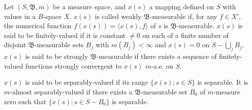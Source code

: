 \label{sec:V.4}

\begin{definition}\label{def:V.4.Definition.1} Let $(S, \mathfrak{B}, m)$ be a measure space, and $x(s)$ a mapping defined on $S$ with values in a $B$-space $X$. $x(s)$ is called weakly $\mathfrak{B}$-measurable if, for any $f \in X'$, the numerical function $f(x(s)) = \langle x(s), f \rangle$ of $s$ is $\mathfrak{B}$-measurable. $x(s)$ is said to be finitely-valued if it is constant $\neq 0$ on each of a finite number of disjoint $\mathfrak{B}$-measurable sets $B_j$ with $m(B_j) < \infty$ and $x(s) = 0$ on $S - \bigcup\limits_{j} B_j$. $x(s)$ is said to be strongly $\mathfrak{B}$-measurable if there exists a sequence of finitely-valued functions strongly convergent to $x(s)$ $m$-a.e. on $S$. 
\end{definition}

\begin{definition}\label{def:V.4.Definition.2} $x(s)$ is said to be separably-valued if its range $\{x(s); s \in S\}$ is separable. It is $m$-almost separably-valued if there exists a $\mathfrak{B}$-measurable set $B_0$ of $m$-measure zero such that $\{x(s); s \in S - B_0\}$ is separable. 
\end{definition}


